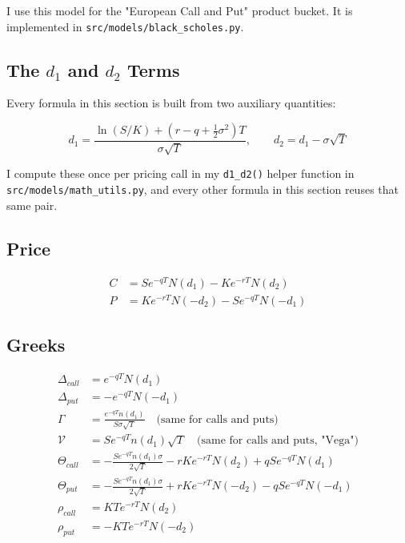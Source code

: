\documentclass[12pt,a4paper]{article}
\begin{document}
I use this model for the "European Call and Put" product bucket. It is
implemented in \texttt{src/models/black\_scholes.py}.

\subsection{The $d_1$ and $d_2$ Terms}

Every formula in this section is built from two auxiliary quantities:

\begin{equation}
d_1 = \frac{\ln(S/K) + \left(r - q + \frac{1}{2}\sigma^2\right)T}{\sigma\sqrt{T}}, \qquad
d_2 = d_1 - \sigma\sqrt{T}
\end{equation}

I compute these once per pricing call in my \texttt{d1\_d2()} helper
function in \texttt{src/models/math\_utils.py}, and every other formula in
this section reuses that same pair.

\subsection{Price}

\begin{align}
C &= S e^{-qT} N(d_1) - K e^{-rT} N(d_2) \\
P &= K e^{-rT} N(-d_2) - S e^{-qT} N(-d_1)
\end{align}

\subsection{Greeks}

\begin{align}
\Delta_{call} &= e^{-qT} N(d_1) \\
\Delta_{put} &= -e^{-qT} N(-d_1) \\
\Gamma &= \frac{e^{-qT} n(d_1)}{S \sigma \sqrt{T}} \quad \text{(same for calls and puts)} \\
\mathcal{V} &= S e^{-qT} n(d_1) \sqrt{T} \quad \text{(same for calls and puts, "Vega")} \\
\Theta_{call} &= -\frac{S e^{-qT} n(d_1) \sigma}{2\sqrt{T}} - rKe^{-rT}N(d_2) + qSe^{-qT}N(d_1) \\
\Theta_{put} &= -\frac{S e^{-qT} n(d_1) \sigma}{2\sqrt{T}} + rKe^{-rT}N(-d_2) - qSe^{-qT}N(-d_1) \\
\rho_{call} &= KTe^{-rT}N(d_2) \\
\rho_{put} &= -KTe^{-rT}N(-d_2)
\end{align}
\end{document}
